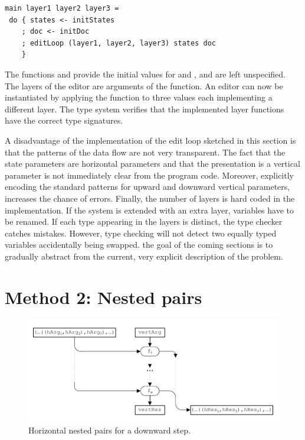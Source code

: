 \documentclass[preprint,natbib]{sigplanconf}
\begin{document}
\begin{small}
\begin{verbatim}
main layer1 layer2 layer3 = 
 do { states <- initStates
    ; doc <- initDoc 
    ; editLoop (layer1, layer2, layer3) states doc
    }
\end{verbatim}
\end{small}

The functions  and  provide the initial values for  and , and are left unspecified. The layers of the editor are arguments of the  function. An editor can now be instantiated by applying the function  to three  values each implementing a different layer. The type system verifies that the implemented layer functions have the correct type signatures.

A disadvantage of the implementation of the edit loop sketched in this section is that the patterns of the data flow are not very transparent. The fact that the state parameters are horizontal parameters and that the presentation is a vertical parameter is not immediately clear from the program code. Moreover, explicitly encoding the standard patterns for upward and downward vertical parameters, increases the chance of errors. Finally, the number of layers is hard coded in the implementation. If the system is extended with an extra layer, variables have to be renamed. If each type appearing in the layers is distinct, the type checker catches mistakes. However, type checking will not detect two equally typed variables accidentally being swapped. the goal of the coming sections is to gradually abstract from the current, very explicit description of the problem.


%																
%																
%																
\section{Method 2: Nested pairs}\label{sect:ncp}

\begin{figure}
\includegraphics[width=\columnwidth]{images/NestedPairs}
\caption{Horizontal nested pairs for a downward step.}\label{ncp} 
\end{figure}
\end{document}

